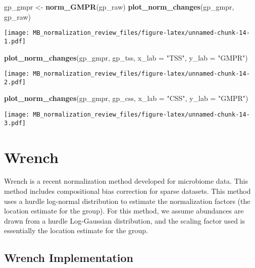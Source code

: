 \documentclass[
]{book}
\newenvironment{Shaded}{\begin{snugshade}}{\end{snugshade}}
\newcommand{\DataTypeTok}[1]{\textcolor[rgb]{0.13,0.29,0.53}{#1}}
\newcommand{\KeywordTok}[1]{\textcolor[rgb]{0.13,0.29,0.53}{\textbf{#1}}}
\newcommand{\NormalTok}[1]{#1}
\newcommand{\StringTok}[1]{\textcolor[rgb]{0.31,0.60,0.02}{#1}}
\begin{document}
\begin{Shaded}
\begin{Highlighting}[]
\NormalTok{gp\_gmpr \textless{}{-}}\StringTok{ }\KeywordTok{norm\_GMPR}\NormalTok{(gp\_raw)}
\KeywordTok{plot\_norm\_changes}\NormalTok{(gp\_gmpr, gp\_raw)}
\end{Highlighting}
\end{Shaded}

\texttt{[image: MB\_normalization\_review\_files/figure-latex/unnamed-chunk-14-1.pdf]}

\begin{Shaded}
\begin{Highlighting}[]
\KeywordTok{plot\_norm\_changes}\NormalTok{(gp\_gmpr, gp\_tss, }\DataTypeTok{x\_lab =} \StringTok{"TSS"}\NormalTok{, }\DataTypeTok{y\_lab =} \StringTok{"GMPR"}\NormalTok{)}
\end{Highlighting}
\end{Shaded}

\texttt{[image: MB\_normalization\_review\_files/figure-latex/unnamed-chunk-14-2.pdf]}

\begin{Shaded}
\begin{Highlighting}[]
\KeywordTok{plot\_norm\_changes}\NormalTok{(gp\_gmpr, gp\_css, }\DataTypeTok{x\_lab =} \StringTok{"CSS"}\NormalTok{, }\DataTypeTok{y\_lab =} \StringTok{"GMPR"}\NormalTok{)}
\end{Highlighting}
\end{Shaded}

\texttt{[image: MB\_normalization\_review\_files/figure-latex/unnamed-chunk-14-3.pdf]}

\hypertarget{wrench}{%
\chapter{Wrench}\label{wrench}}

Wrench is a recent normalization method developed for microbiome data. This method includes compositional bias correction for sparse datasets. This method uses a hurdle log-normal distribution to estimate the normalization factors (the location estimate for the group). For this method, we assume abundances are drawn from a hurdle Log-Gaussian distribution, and the scaling factor used is essentially the location estimate for the group.

\hypertarget{wrench-implementation}{%
\section{Wrench Implementation}\label{wrench-implementation}}
\end{document}
